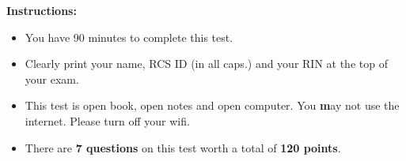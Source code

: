 \documentclass[10pt]{article}
\begin{document}
\vspace*{.45in} 

{\large\bf Instructions:}
\begin{itemize}
\item You have 90 minutes to complete this test.
\item Clearly print your name, RCS ID (in all caps.) and your RIN at the top of your exam.
\item This test is open book, open notes and open computer. You {\textbf may not} use the internet. Please turn off your wifi.
\item There are \textbf{7 questions} on this test worth a total of
  \textbf{120 points}.
\end{itemize}


\newpage

\fi
\end{document}
